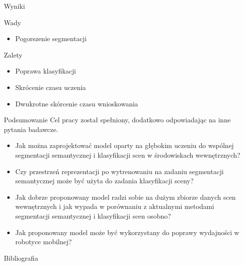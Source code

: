 \documentclass[10pt]{beamer}
\begin{document}
\begin{frame}{Wyniki}
    \begin{block}{Wady}
        \begin{itemize}
            \item Pogorszenie segmentacji
        \end{itemize}
    \end{block}


    \begin{block}{Zalety}
        \begin{itemize}
            \item Poprawa klasyfikacji
            \item Skrócenie czasu uczenia
            \item Dwukrotne skórcenie czasu wnioskowania
        \end{itemize}
    \end{block}
    
\end{frame}

\begin{frame}{Podsumowanie}
    Cel pracy został spełniony, dodatkowo odpowiadając na inne pytania badawcze.
    \begin{itemize}
        \item Jak można zaprojektować model oparty na głębokim uczeniu do wspólnej segmentacji semantycznej i klasyfikacji scen w środowiskach wewnętrznych?
        \item Czy przestrzeń reprezentacji po wytrenowaniu na zadaniu segmentacji semantycznej może być użyta do zadania klasyfikacji sceny?
        \item Jak dobrze proponowany model radzi sobie na dużym zbiorze danych scen wewnętrznych i jak wypada w porównaniu z aktualnymi metodami segmentacji semantycznej i klasyfikacji scen osobno?
        \item Jak proponowany model może być wykorzystany do poprawy wydajności w robotyce mobilnej?
    \end{itemize}

    

\end{frame}
\begin{frame}{Bibliografia}
    
    
    
    
\end{frame}


\appendix
\end{document}
